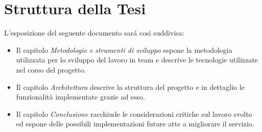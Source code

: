 \section{Struttura della Tesi}
L'esposizione del seguente documento sará cosi suddivisa:
\begin{itemize}
\item Il capitolo \emph{Metodologie e strumenti di sviluppo} espone la metodologia utilizzata per lo sviluppo del lavoro in team e descrive le tecnologie utilizzate nel corso del progetto.
\item Il capitolo \emph{Architettura} descrive la struttura del progetto e in dettaglio le funzionalità implementate grazie ad esso.
\item Il capitolo \emph{Conclusione} racchiude le considerazioni critiche sul lavoro svolto ed espone delle possibili implementazioni future atte a migliorare il servizio.
\end{itemize}






